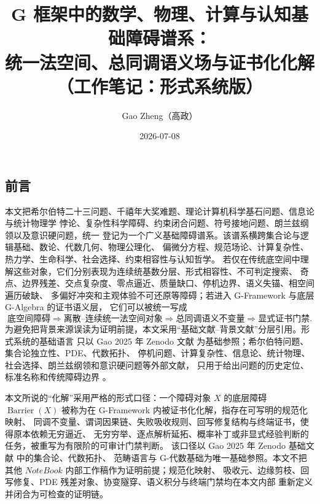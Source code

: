 \documentclass[12pt]{article}
\newcommand{\GFramework}{\textsf{G-Framework}}
\newcommand{\GAlgebra}{\textsf{G-Algebra}}
\DeclareMathOperator{\Barrier}{Barrier}
\begin{document}
\begin{CJK*}{UTF8}{gkai}

\title{G 框架中的数学、物理、计算与认知基础障碍谱系：\\统一法空间、总同调语义场与证书化化解\\（工作笔记：形式系统版）}
\author{Gao Zheng（高政）}
\date{2026-07-08}
\maketitle

\section*{前言}

本文把希尔伯特二十三问题、千禧年大奖难题、理论计算机科学基石问题、信息论与统计物理学
悖论、复杂性科学障碍、约束闭合问题、符号接地问题、朗兰兹纲领以及意识硬问题，统一
登记为一个广义基础障碍谱系。该谱系横跨集合论与逻辑基础、数论、代数几何、物理公理化、
偏微分方程、规范场论、计算复杂性、热力学、生命科学、社会选择、约束相容性与认知哲学。
若仅在传统底空间中理解这些对象，它们分别表现为连续统基数分层、形式相容性、不可判定搜索、
奇点、边界残差、交点复杂度、零点逼近、质量缺口、停机边界、语义失锚、相空间遍历破缺、
多偏好冲突和主观体验不可还原等障碍；若进入 \GFramework{} 与底层 \GAlgebra{} 的证书语义层，
它们可以被统一写成
\[
  \text{底空间障碍}
  \Longrightarrow
  \text{离散--连续统一法空间对象}
  \Longrightarrow
  \text{总同调语义不变量}
  \Longrightarrow
  \text{显式证书门禁}.
\]
为避免把背景来源误读为证明前提，本文采用“基础文献--背景文献”分层引用。形式系统的基础语言
只以 Gao 2025 年 Zenodo 文献 \cite{Gao2025PureMathZenodo} 为基础参照；希尔伯特问题、集合论独立性、PDE、代数拓扑、
停机问题、计算复杂性、信息论、统计物理、社会选择、朗兰兹纲领和意识硬问题等外部文献，
只用于给出问题的历史定位、标准名称和传统障碍边界
\cite{Hilbert1902Problems,Godel1940,Cohen1963,Jech2003,Evans2010PDE,
BrennerScott2008FEM,Hatcher2002AT,Turing1936Computable,Cook1971NP,
Karp1972Reducibility,Shannon1948Communication,Birkhoff1931Ergodic,
Arrow1951SocialChoice,Langlands1970Problems,Chalmers1995Facing}。

本文所说的“化解”采用严格的形式口径：一个障碍对象 \(X\) 的底层障碍
\(\Barrier(X)\) 被称为在 \GFramework{} 内被证书化化解，指存在可写明的规范化映射、
同调不变量、谓词因果链、失败吸收规则、回写修复结构与终端证书，使得原本依赖无穷逼近、
无穷穷举、逐点解析延拓、概率补丁或非显式经验判断的任务，被重写为有限阶的可审计门禁判断。
该口径以 Gao 2025 年 Zenodo 基础文献 \cite{Gao2025PureMathZenodo} 中的集合论、代数拓扑、
范畴语言与 G-代数基础为唯一基础参照。本文不把其他 \(NoteBook\) 内部工作稿作为证明前提；规范化映射、
吸收元、边缘剪枝、回写修复、PDE 残差对象、协变隧穿、语义积分与终端门禁均在本文内部
重新定义并闭合为可检查的证明链。


\end{CJK*}
\end{document}
